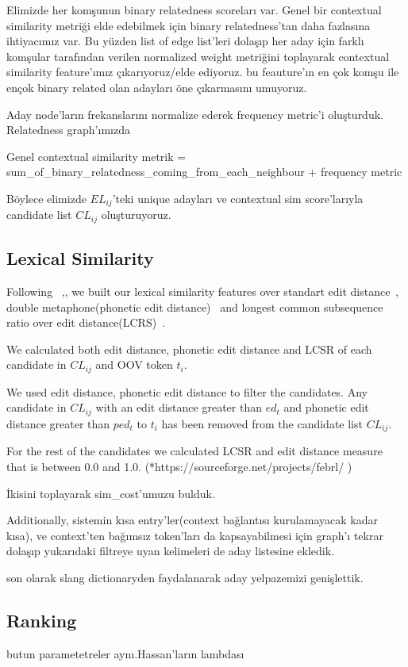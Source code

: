 Elimizde her komşunun binary relatedness scoreları var. Genel bir contextual similarity metriği elde edebilmek için binary relatedness'tan daha fazlasına ihtiyacımız var. Bu yüzden list of edge list'leri dolaşıp her aday için farklı komşular tarafından verilen normalized weight metriğini toplayarak contextual similarity feature'ımız çıkarıyoruz/elde ediyoruz. bu feauture'ın en çok komşu ile ençok binary related olan adayları öne çıkarmasını umuyoruz.

Aday node'ların frekanslarını normalize ederek frequency metric'i oluşturduk. Relatedness graph'ımızda 

Genel contextual similarity metrik = sum_of_binary_relatedness_coming_from_each_neighbour + frequency metric

Böylece elimizde $EL_{ij}$'teki unique adayları ve contextual sim score'larıyla candidate list $CL_{ij}$ oluşturuyoruz.

\subsection{Lexical Similarity}

Following ~\cite{Han:2011:LNS:2002472.2002520},\cite{DBLP:conf/acl/HassanM13}, we built our lexical similarity features over standart edit distance~\cite{levenshtein1966bcc}, double metaphone(phonetic edit distance)~\cite{Philips:2000:DMS:349124.349132} and longest common subsequence ratio over edit distance(LCRS)~\cite{Contractor:2010:UCN:1944566.1944588}.

We calculated both edit distance, phonetic edit distance and LCSR of each candidate in $CL_{ij}$ and OOV token $t_i$.

We used edit distance, phonetic edit distance to filter the candidates. Any candidate in $CL_{ij}$ with an edit distance greater than $ed_t$ and phonetic edit distance greater than $ped_t$ to $t_i$ has been removed from the candidate list $CL_{ij}$.

For the rest of the candidates we calculated LCSR and edit distance measure that is between 0.0 and 1.0. (*https://sourceforge.net/projects/febrl/ ) 

İkisini toplayarak sim_cost'umuzu bulduk.

Additionally, sistemin kısa entry'ler(context bağlantısı kurulamayacak kadar kısa), ve context'ten bağımsız token'ları da kapsayabilmesi için graph'ı tekrar dolaşıp yukarıdaki filtreye uyan kelimeleri de aday listesine ekledik.

son olarak slang dictionaryden faydalanarak aday yelpazemizi genişlettik.

\subsection{Ranking}

butun parametetreler aynı.Hassan'ların lambdası
